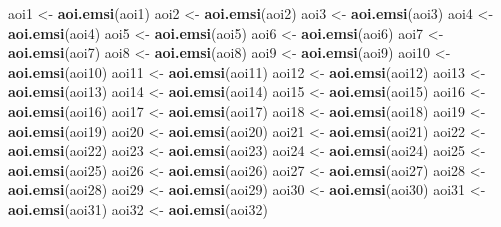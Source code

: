 \documentclass[
]{article}
\newenvironment{Shaded}{\begin{snugshade}}{\end{snugshade}}
\newcommand{\KeywordTok}[1]{\textcolor[rgb]{0.13,0.29,0.53}{\textbf{#1}}}
\newcommand{\NormalTok}[1]{#1}
\newcommand{\StringTok}[1]{\textcolor[rgb]{0.31,0.60,0.02}{#1}}
\begin{document}
\begin{Shaded}
\begin{Highlighting}[]
\NormalTok{aoi1 <-}\StringTok{ }\KeywordTok{aoi.emsi}\NormalTok{(aoi1)}
\NormalTok{aoi2 <-}\StringTok{ }\KeywordTok{aoi.emsi}\NormalTok{(aoi2)}
\NormalTok{aoi3 <-}\StringTok{ }\KeywordTok{aoi.emsi}\NormalTok{(aoi3)}
\NormalTok{aoi4 <-}\StringTok{ }\KeywordTok{aoi.emsi}\NormalTok{(aoi4)}
\NormalTok{aoi5 <-}\StringTok{ }\KeywordTok{aoi.emsi}\NormalTok{(aoi5)}
\NormalTok{aoi6 <-}\StringTok{ }\KeywordTok{aoi.emsi}\NormalTok{(aoi6)}
\NormalTok{aoi7 <-}\StringTok{ }\KeywordTok{aoi.emsi}\NormalTok{(aoi7)}
\NormalTok{aoi8 <-}\StringTok{ }\KeywordTok{aoi.emsi}\NormalTok{(aoi8)}
\NormalTok{aoi9 <-}\StringTok{ }\KeywordTok{aoi.emsi}\NormalTok{(aoi9)}
\NormalTok{aoi10 <-}\StringTok{ }\KeywordTok{aoi.emsi}\NormalTok{(aoi10)}
\NormalTok{aoi11 <-}\StringTok{ }\KeywordTok{aoi.emsi}\NormalTok{(aoi11)}
\NormalTok{aoi12 <-}\StringTok{ }\KeywordTok{aoi.emsi}\NormalTok{(aoi12)}
\NormalTok{aoi13 <-}\StringTok{ }\KeywordTok{aoi.emsi}\NormalTok{(aoi13)}
\NormalTok{aoi14 <-}\StringTok{ }\KeywordTok{aoi.emsi}\NormalTok{(aoi14)}
\NormalTok{aoi15 <-}\StringTok{ }\KeywordTok{aoi.emsi}\NormalTok{(aoi15)}
\NormalTok{aoi16 <-}\StringTok{ }\KeywordTok{aoi.emsi}\NormalTok{(aoi16)}
\NormalTok{aoi17 <-}\StringTok{ }\KeywordTok{aoi.emsi}\NormalTok{(aoi17)}
\NormalTok{aoi18 <-}\StringTok{ }\KeywordTok{aoi.emsi}\NormalTok{(aoi18)}
\NormalTok{aoi19 <-}\StringTok{ }\KeywordTok{aoi.emsi}\NormalTok{(aoi19)}
\NormalTok{aoi20 <-}\StringTok{ }\KeywordTok{aoi.emsi}\NormalTok{(aoi20)}
\NormalTok{aoi21 <-}\StringTok{ }\KeywordTok{aoi.emsi}\NormalTok{(aoi21)}
\NormalTok{aoi22 <-}\StringTok{ }\KeywordTok{aoi.emsi}\NormalTok{(aoi22)}
\NormalTok{aoi23 <-}\StringTok{ }\KeywordTok{aoi.emsi}\NormalTok{(aoi23)}
\NormalTok{aoi24 <-}\StringTok{ }\KeywordTok{aoi.emsi}\NormalTok{(aoi24)}
\NormalTok{aoi25 <-}\StringTok{ }\KeywordTok{aoi.emsi}\NormalTok{(aoi25)}
\NormalTok{aoi26 <-}\StringTok{ }\KeywordTok{aoi.emsi}\NormalTok{(aoi26)}
\NormalTok{aoi27 <-}\StringTok{ }\KeywordTok{aoi.emsi}\NormalTok{(aoi27)}
\NormalTok{aoi28 <-}\StringTok{ }\KeywordTok{aoi.emsi}\NormalTok{(aoi28)}
\NormalTok{aoi29 <-}\StringTok{ }\KeywordTok{aoi.emsi}\NormalTok{(aoi29)}
\NormalTok{aoi30 <-}\StringTok{ }\KeywordTok{aoi.emsi}\NormalTok{(aoi30)}
\NormalTok{aoi31 <-}\StringTok{ }\KeywordTok{aoi.emsi}\NormalTok{(aoi31)}
\NormalTok{aoi32 <-}\StringTok{ }\KeywordTok{aoi.emsi}\NormalTok{(aoi32)}
\end{Highlighting}
\end{Shaded}
\end{document}
